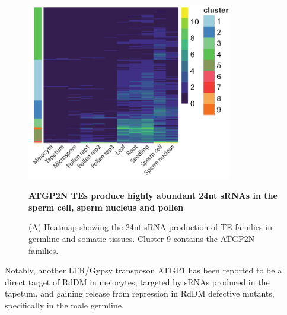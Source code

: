 \begin{figure}[htbp!] 
\centering    
    \includegraphics[width=0.8\textwidth]{Chapter2/Figs/Figure13_TE_families_heatmap.pdf}
\caption{\textbf{ATGP2N TEs produce highly abundant 24nt sRNAs in the sperm cell, sperm nucleus and pollen}}
\label{fig:TE_families}
\captionsetup{font=small}
    \caption*{(A) Heatmap showing the 24nt sRNA production of TE families in germline and somatic tissues. Cluster 9 contains the ATGP2N families.}
\end{figure}

Notably, another LTR/Gypsy transposon ATGP1 has been reported to be a direct target of RdDM in meiocytes, targeted by sRNAs produced in the tapetum, and gaining release from repression in RdDM defective mutants\cite{RN187}, specifically in the male germline.


